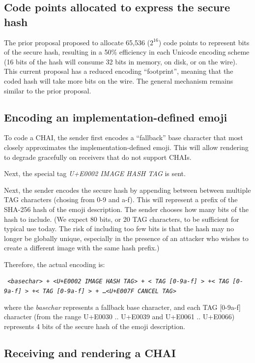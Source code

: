 \documentclass[12pt]{article}
\begin{document}
\subsection{Code points allocated to express the secure hash}

The prior proposal proposed to allocate 65,536 ($2^{16}$) code points to represent bits
of the secure hash, resulting in a 50\% efficiency in each Unicode encoding scheme (16 bits of
the hash will consume 32 bits in memory, on disk, or on the wire)\autocite{L216105}. This current proposal has a reduced encoding ``footprint'', meaning that the coded hash will take more bits
on the wire. The general mechanism remains similar to the prior proposal.

\subsection{Encoding an implementation-defined emoji}

To code a CHAI, the sender first encodes a ``fallback'' base character
that most closely approximates the implementation-defined emoji. This
will allow rendering to degrade gracefully on receivers that do not
support CHAIs.

Next, the special tag \textit{U+E0002 IMAGE HASH TAG} is sent.

Next, the sender encodes the secure hash by appending between between
multiple TAG characters (chosing from 0-9 and a-f). This will represent a prefix of the
SHA-256 hash of the emoji description. The sender chooses how many
bits of the hash to include. (We expect 80 bits, or 20 TAG
characters, to be sufficient for typical use today. The risk of
including too few bits is that the hash may no longer be globally unique,
especially in the presence of an attacker who wishes to create a different
image with the same hash prefix.)

Therefore, the actual encoding is:

\texttt { <\textit{basechar}> + <\textit{U+E0002 IMAGE HASH TAG}> + <\textit{ TAG [0-9a-f] }> +<\textit{ TAG [0-9a-f] }> +<\textit{ TAG [0-9a-f] }> + \ldots <\textit{U+E007F CANCEL TAG}> }

where the \textit{basechar} represents a fallback base character, and
each TAG [0-9a-f] character (from the range U+E0030 .. U+E0039 and U+E0061
.. U+E0066) represents 4 bits of the secure hash of the emoji
description.

\subsection{Receiving and rendering a CHAI}
\end{document}
